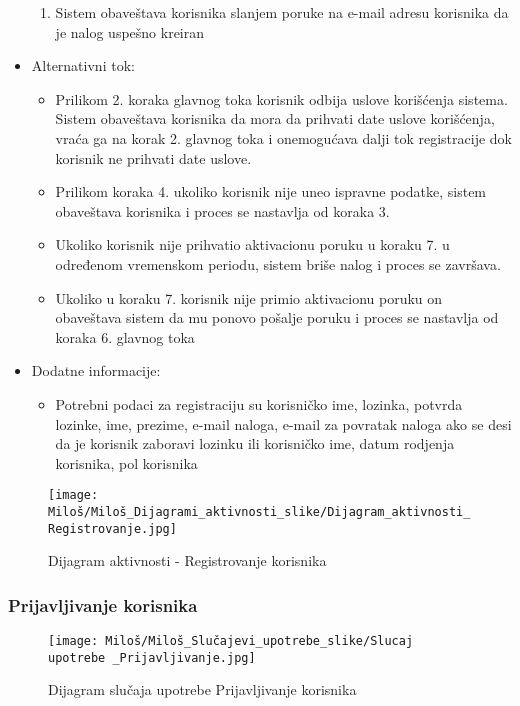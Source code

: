 \documentclass[a4paper]{article}
\begin{document}
\begin{itemize}
\begin{enumerate}
            \item Sistem obaveštava korisnika slanjem poruke na e-mail adresu korisnika da je nalog uspešno kreiran 
        \end{enumerate}
    \item Alternativni tok:
        \begin{itemize}
            \item Prilikom 2. koraka glavnog toka korisnik odbija uslove korišćenja sistema. Sistem obaveštava korisnika da mora da prihvati date uslove korišćenja, vraća ga na korak 2. glavnog toka i onemogućava dalji tok registracije dok korisnik ne prihvati date uslove.
            \item Prilikom koraka 4. ukoliko korisnik nije uneo ispravne podatke, sistem obaveštava korisnika i proces se nastavlja od koraka 3.
            \item Ukoliko korisnik nije prihvatio aktivacionu poruku u koraku 7. u određenom vremenskom periodu, sistem briše nalog i proces se završava.
            \item Ukoliko u koraku 7. korisnik nije primio aktivacionu poruku on obaveštava sistem da mu ponovo pošalje poruku i proces se nastavlja od koraka 6. glavnog toka
        \end{itemize}
    \item Dodatne informacije:
        \begin{itemize}
            \item Potrebni podaci za registraciju su korisničko ime, lozinka, potvrda lozinke, ime, prezime, e-mail naloga, e-mail za povratak naloga ako se desi da je korisnik zaboravi lozinku ili korisničko ime, datum rodjenja korisnika, pol korisnika
        \end{itemize}
\end{itemize}

\begin{figure}[htp]
    \centering
    \texttt{[image: Miloš/Miloš\_Dijagrami\_aktivnosti\_slike/Dijagram\_aktivnosti\_Registrovanje.jpg]}
    \caption{Dijagram aktivnosti - Registrovanje korisnika}
    \label{fig:Registracija aktivnost}
\end{figure}


\subsubsection{Prijavljivanje korisnika}

\begin{figure}[htp]
    \centering
    \texttt{[image: Miloš/Miloš\_Slučajevi\_upotrebe\_slike/Slucaj upotrebe \_Prijavljivanje.jpg]}
    \caption{Dijagram slučaja upotrebe Prijavljivanje korisnika}
    \label{fig:Prijavljivanje}
\end{figure}
\end{document}
